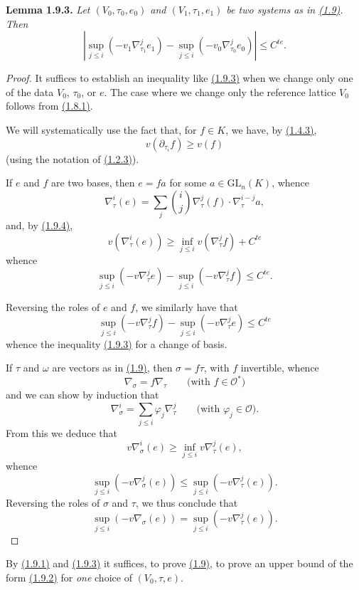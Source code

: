 \documentclass{report}
\newenvironment{itenv}[1]
  {\phantomsection\par\medskip\noindent\textbf{#1.}\itshape}
  {\par\medskip}
\renewcommand{\cal}[1]{{\mathcal{#1}}}
\newcommand{\GL}{\mathrm{GL}}
\renewcommand{\geq}{\geqslant}
\renewcommand{\leq}{\leqslant}
\newcommand{\oldpage}[1]{\marginpar{\footnotesize$\Big\vert$ \textit{p.~#1}}}
\begin{document}
\begin{itenv}{Lemma 1.9.3}
\label{II.1.9.3}
  Let $(V_0,\tau_0,e_0)$ and $(V_1,\tau_1,e_1)$ be two systems as in \hyperref[II.1.9]{(1.9)}.
  Then
  \[
    |\sup_{j\leq i}(-v_1\nabla_{\tau_1}^j e_1) - \sup_{j\leq i}(-v_0\nabla_{\tau_0}^j e_0)| \leq C^{te}.
  \]
\end{itenv}

\begin{proof}
  It suffices to establish an inequality like \hyperref[II.1.9.3]{(1.9.3)} when we change only one of the data $V_0$, $\tau_0$, or $e$.
  The case where we change only the reference lattice $V_0$ follows from \hyperref[II.1.8.1]{(1.8.1)}.

  We will systematically use the fact that, for $f\in K$, we have, by \hyperref[II.1.4.3]{(1.4.3)},
  \[
  \label{II.1.9.4}
    v(\partial_{\tau_i}f) \geq v(f)
  \tag{1.9.4}
  \]
  (using the notation of \hyperref[II.1.2.3]{(1.2.3)}).

  If $e$ and $f$ are two bases, then $e=fa$ for some $a\in\GL_n(K)$, whence
  \[
    \nabla_\tau^i(e) = \sum_j\binom{i}{j}\nabla_\tau^j(f)\cdot\nabla_\tau^{i-j}a,
  \]
  and, by \hyperref[II.1.9.4]{(1.9.4)},
  \[
    v(\nabla_\tau^i(e)) \geq \inf_{j\leq i}v(\nabla_\tau^j f) + C^{te}
  \]
  whence
  \[
    \sup_{j\leq i}(-v\nabla_\tau^j e) - \sup_{j\leq i}(-v\nabla_\tau^j f) \leq C^{te}.
  \]

  Reversing the roles of $e$ and $f$, we similarly have that
  \[
    \sup_{j\leq i}(-v\nabla_\tau^j f) - \sup_{j\leq i}(-v\nabla_\tau^j e) \leq C^{te}
  \]
  whence the inequality \hyperref[II.1.9.3]{(1.9.3)} for a change of basis.

\oldpage{47}
  If $\tau$ and $\omega$ are vectors as in \hyperref[II.1.9]{(1.9)}, then $\sigma=f\tau$, with $f$ invertible, whence
  \[
    \nabla_\sigma = f\nabla_\tau
    \qquad\mbox{(with $f\in\cal{O}^*$)}
  \]
  and we can show by induction that
  \[
    \nabla_\sigma^i = \sum_{j\leq i}\varphi_j\nabla_\tau^j
    \qquad\mbox{(with $\varphi_j\in\cal{O}$)}.
  \]
  From this we deduce that
  \[
    v\nabla_\sigma^i(e) \geq \inf_{j\leq i}v\nabla_\tau^j(e),
  \]
  whence
  \[
    \sup_{j\leq i}(-v\nabla_\sigma^j(e)) \leq \sup_{j\leq i}(-v\nabla_\tau^j(e)).
  \]
  Reversing the roles of $\sigma$ and $\tau$, we thus conclude that
  \[
  \label{II.1.9.5}
    \sup_{j\leq i}(-v\nabla_\sigma(e)) = \sup_{j\leq i}(-v\nabla_\tau^j(e)).
  \tag{1.9.5}
  \]
\end{proof}

By \hyperref[II.1.9.1]{(1.9.1)} and \hyperref[II.1.9.3]{(1.9.3)} it suffices, to prove \hyperref[II.1.9]{(1.9)}, to prove an upper bound of the form \hyperref[II.1.9.2]{(1.9.2)} for \emph{one} choice of $(V_0,\tau,e)$.
\end{document}
